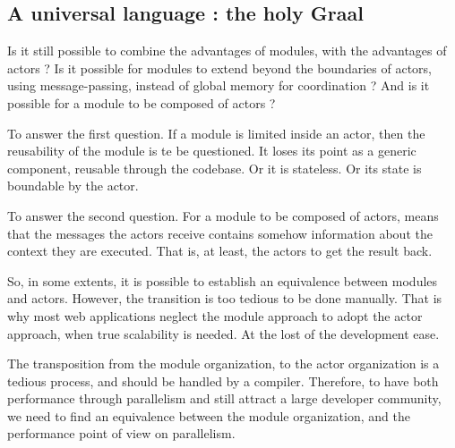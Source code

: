 \subsection{A universal language : the holy Graal}


Is it still possible to combine the advantages of modules, with the advantages of actors ?
Is it possible for modules to extend beyond the boundaries of actors, using message-passing, instead of global memory for coordination ?
And is it possible for a module to be composed of actors ?

To answer the first question.
If a module is limited inside an actor, then the reusability of the module is te be questioned.
It loses its point as a generic component, reusable through the codebase.
Or it is stateless.
Or its state is boundable by the actor.

To answer the second question.
For a module to be composed of actors, means that the messages the actors receive contains somehow information about the context they are executed.
That is, at least, the actors to get the result back.

So, in some extents, it is possible to establish an equivalence between modules and actors. However, the transition is too tedious to be done manually.
That is why most web applications neglect the module approach to adopt the actor approach, when true scalability is needed.
At the lost of the development ease.











The transposition from the module organization, to the actor organization is a tedious process, and should be handled by a compiler.
Therefore, to have both performance through parallelism and still attract a large developer community, we need to find an equivalence between the module organization, and the performance point of view on parallelism.

